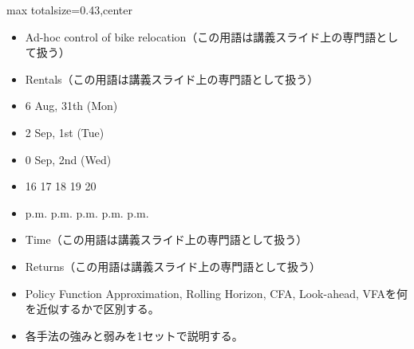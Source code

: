 \clearpage
{}
\begin{minipage}[t]{0.405\textwidth}
\begin{adjustbox}{max totalsize={\textwidth}{0.43\textheight},center}
\begin{minipage}{\textwidth}\scriptsize
{}\begin{itemize}
\item Ad-hoc control of bike relocation（この用語は講義スライド上の専門語として扱う）
\item Rentals（この用語は講義スライド上の専門語として扱う）
\item 6 Aug, 31th (Mon)
\item 2 Sep, 1st (Tue)
\item 0 Sep, 2nd (Wed)
\item 16 17 18 19 20
\item p.m. p.m. p.m. p.m. p.m.
\item Time（この用語は講義スライド上の専門語として扱う）
\item Returns（この用語は講義スライド上の専門語として扱う）
\end{itemize}\begin{itemize}
\item Policy Function Approximation, Rolling Horizon, CFA, Look-ahead, VFAを何を近似するかで区別する。
\item 各手法の強みと弱みを1セットで説明する。
\end{itemize}
\end{minipage}
\end{adjustbox}
\end{minipage}\hfill
